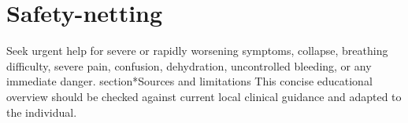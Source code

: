 \section*{Safety-netting}
Seek urgent help for severe or rapidly worsening symptoms, collapse, breathing difficulty, severe pain, confusion, dehydration, uncontrolled bleeding, or any immediate danger.
section*{Sources and limitations}
This concise educational overview should be checked against current local clinical guidance and adapted to the individual.
